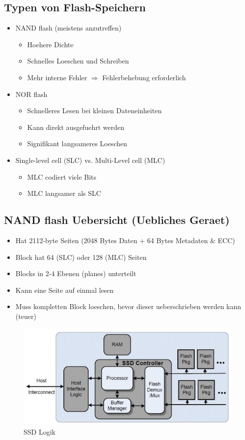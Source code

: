 \documentclass[a4paper]{scrreprt}
\begin{document}
\subsection{Typen von Flash-Speichern}
\begin{itemize}
	\item NAND flash (meistens anzutreffen)
		\begin{itemize}
			\item Hoehere Dichte
			\item Schnelles Loeschen und Schreiben
			\item Mehr interne Fehler $\Rightarrow$ Fehlerbehebung erforderlich
		\end{itemize}
	\item NOR flash
		\begin{itemize}
			\item Schnelleres Lesen bei kleinen Dateneinheiten
			\item Kann direkt ausgefuehrt werden
			\item Signifikant langsameres Loeschen
		\end{itemize}
	\item Single-level cell (SLC) vs. Multi-Level cell (MLC)
		\begin{itemize}
			\item MLC codiert viele Bits
			\item MLC langsamer als SLC
		\end{itemize}
\end{itemize}

\subsection{NAND flash Uebersicht (Uebliches Geraet)}
\begin{itemize}
	\item Hat 2112-byte Seiten (2048 Bytes Daten + 64 Bytes Metadaten \& ECC)
	\item Block hat 64 (SLC) oder 128 (MLC) Seiten
	\item Blocks in 2-4 Ebenen (planes) unterteilt
	\item Kann eine Seite auf einmal lesen
	\item Muss kompletten Block loeschen, bevor dieser ueberschrieben werden kann (teuer)
\end{itemize}

\begin{figure}[ht]
\centering
\includegraphics[scale=0.3]{ssd.png}
\caption{SSD Logik}
\end{figure}
\end{document}
